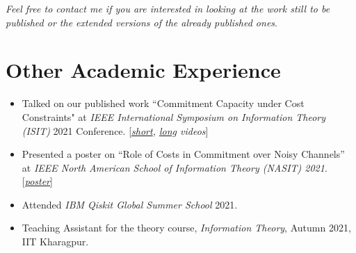 \documentclass[a4paper,10pt]{article}
\begin{document}
\footnotesize{\textit{Feel free to contact me if you are interested in looking at the work still to be published or the extended versions of the already published ones}}\normalsize{.}

\section{Other Academic Experience}
\small
\begin{itemize}
	\item Talked on our published work ``Commitment Capacity under Cost Constraints" at \textit{IEEE International Symposium on Information Theory (ISIT)} 2021 Conference. [\textit{\href{https://drive.google.com/file/d/1wa_nDtqyEUFPBMkJChlZAyT96lmBZcB5/view?usp=sharing}{short}, \href{https://drive.google.com/file/d/1hgJ9LcpQ_dybLoeyZEmrDeuTUJVGlrOR/view?usp=sharing}{long} videos}] 
	\item Presented a poster on ``Role of Costs in Commitment over Noisy Channels'' at \textit{IEEE North American School of Information Theory (NASIT) 2021}. [\textit{\href{https://drive.google.com/file/d/1--6cyQ98YNENRDTdBlBZsV1YmH0Fi6Ve/view?usp=sharing}{\textit{poster}}}]
	\item Attended \textit{IBM Qiskit Global Summer School} 2021.
	\item Teaching Assistant for the theory course, \textit{Information Theory}, Autumn 2021, IIT Kharagpur.
\end{itemize}
\end{document}

